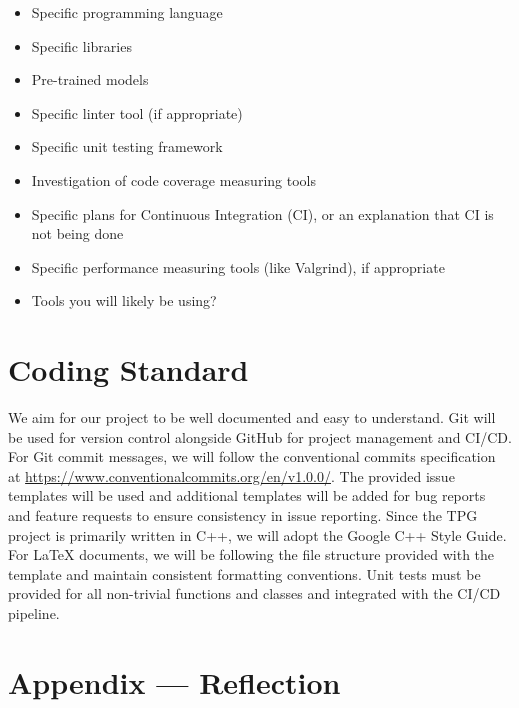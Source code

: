 \documentclass{article}
\begin{document}
\begin{itemize}
\item Specific programming language
\item Specific libraries
\item Pre-trained models
\item Specific linter tool (if appropriate)
\item Specific unit testing framework
\item Investigation of code coverage measuring tools
\item Specific plans for Continuous Integration (CI), or an explanation that CI
  is not being done
\item Specific performance measuring tools (like Valgrind), if
  appropriate
\item Tools you will likely be using?
\end{itemize}


\section{Coding Standard}

We aim for our project to be well documented and easy to understand. Git will be used for version control alongside GitHub for project management and CI/CD. For Git commit messages, we will follow the conventional commits specification at \url{https://www.conventionalcommits.org/en/v1.0.0/}. The provided issue templates will be used and additional templates will be added for bug reports and feature requests to ensure consistency in issue reporting. Since the TPG project is primarily written in C++, we will adopt the Google C++ Style Guide. For LaTeX documents, we will be following the file structure provided with the template and maintain consistent formatting conventions. Unit tests must be provided for all non-trivial functions and classes and integrated with the CI/CD pipeline.

\newpage{}

\section*{Appendix --- Reflection}



\end{document}
